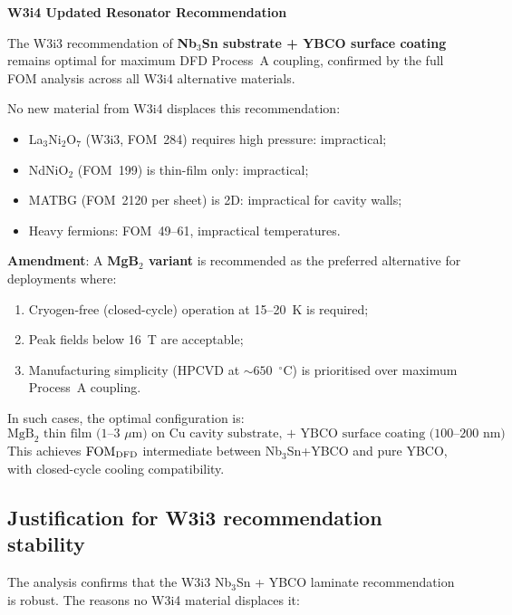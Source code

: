 \documentclass[11pt]{article}
\newcommand{\FOM}{\mathrm{FOM}}
\begin{document}
\begin{mdframed}[backgroundcolor=yellow!10]
\textbf{W3i4 Updated Resonator Recommendation}

The W3i3 recommendation of \textbf{Nb$_3$Sn substrate + YBCO surface
coating} remains optimal for maximum DFD Process~A coupling, confirmed by
the full FOM analysis across all W3i4 alternative materials.

No new material from W3i4 displaces this recommendation:
\begin{itemize}
\item La$_3$Ni$_2$O$_7$ (W3i3, FOM~284) requires high pressure: impractical;
\item NdNiO$_2$ (FOM~199) is thin-film only: impractical;
\item MATBG (FOM~2120 per sheet) is 2D: impractical for cavity walls;
\item Heavy fermions: FOM~49--61, impractical temperatures.
\end{itemize}

\textbf{Amendment}: A \textbf{MgB$_2$ variant} is recommended as the
preferred alternative for deployments where:
\begin{enumerate}
\item Cryogen-free (closed-cycle) operation at 15--20~K is required;
\item Peak fields below 16~T are acceptable;
\item Manufacturing simplicity (HPCVD at $\sim 650$~$^\circ$C) is prioritised
  over maximum Process~A coupling.
\end{enumerate}

In such cases, the optimal configuration is:
\begin{equation}
\boxed{\text{MgB}_2\text{ thin film (1--3~$\mu$m) on Cu cavity substrate,}
\text{ + YBCO surface coating (100--200~nm)}}
\end{equation}
This achieves $\FOM_{\rm DFD}$ intermediate between Nb$_3$Sn+YBCO and
pure YBCO, with closed-cycle cooling compatibility.
\end{mdframed}

\subsection{Justification for W3i3 recommendation stability}

The analysis confirms that the W3i3 Nb$_3$Sn + YBCO laminate recommendation
is robust. The reasons no W3i4 material displaces it:
\end{document}
